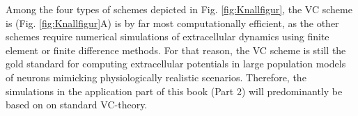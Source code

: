 Among the four types of schemes depicted in Fig. \ref{fig:Knallfigur}, the VC scheme is (Fig. \ref{fig:Knallfigur}A) is by far most computationally efficient, as the other schemes require numerical simulations of extracellular dynamics using finite element or finite difference methods. For that reason, the VC scheme is still the gold standard for computing extracellular potentials in large population models of neurons mimicking physiologically realistic scenarios. Therefore, the simulations in the application part of this book (Part 2) will predominantly be based on on standard VC-theory.
